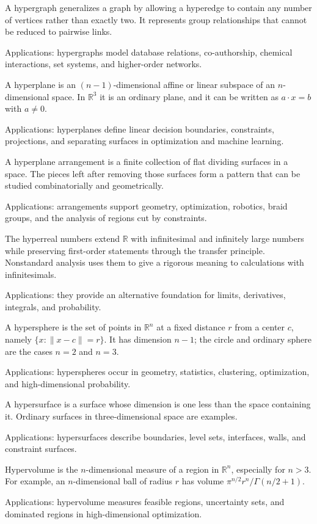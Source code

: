 A hypergraph generalizes a graph by allowing a hyperedge to contain any number of vertices rather than exactly two. It represents group relationships that cannot be reduced to pairwise links. \par\noindent Applications: hypergraphs model database relations, co-authorship, chemical interactions, set systems, and higher-order networks.

A hyperplane is an $(n-1)$-dimensional affine or linear subspace of an $n$-dimensional space. In $\mathbb{R}^3$ it is an ordinary plane, and it can be written as $a\cdot x=b$ with $a\ne0$. \par\noindent Applications: hyperplanes define linear decision boundaries, constraints, projections, and separating surfaces in optimization and machine learning.

A hyperplane arrangement is a finite collection of flat dividing surfaces in a space. The pieces left after removing those surfaces form a pattern that can be studied combinatorially and geometrically. \par\noindent Applications: arrangements support geometry, optimization, robotics, braid groups, and the analysis of regions cut by constraints.

The hyperreal numbers extend $\mathbb{R}$ with infinitesimal and infinitely large numbers while preserving first-order statements through the transfer principle. Nonstandard analysis uses them to give a rigorous meaning to calculations with infinitesimals. \par\noindent Applications: they provide an alternative foundation for limits, derivatives, integrals, and probability.

A hypersphere is the set of points in $\mathbb{R}^n$ at a fixed distance $r$ from a center $c$, namely $\{x:\|x-c\|=r\}$. It has dimension $n-1$; the circle and ordinary sphere are the cases $n=2$ and $n=3$. \par\noindent Applications: hyperspheres occur in geometry, statistics, clustering, optimization, and high-dimensional probability.

A hypersurface is a surface whose dimension is one less than the space containing it. Ordinary surfaces in three-dimensional space are examples. \par\noindent Applications: hypersurfaces describe boundaries, level sets, interfaces, walls, and constraint surfaces.

Hypervolume is the $n$-dimensional measure of a region in $\mathbb{R}^n$, especially for $n>3$. For example, an $n$-dimensional ball of radius $r$ has volume $\pi^{n/2}r^n/\Gamma(n/2+1)$. \par\noindent Applications: hypervolume measures feasible regions, uncertainty sets, and dominated regions in high-dimensional optimization.
